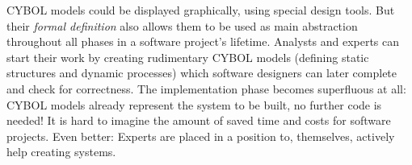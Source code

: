 CYBOL models could be displayed graphically, using special design tools. But their
\emph{formal definition} also allows them to be used as main abstraction throughout
all phases in a software project's lifetime. Analysts and experts can start their
work by creating rudimentary CYBOL models (defining static structures and dynamic
processes) which software designers can later complete and check for correctness.
The implementation phase becomes superfluous at all: CYBOL models already represent
the system to be built, no further code is needed! It is hard to imagine the amount
of saved time and costs for software projects. Even better: Experts are placed in
a position to, themselves, actively help creating systems.
